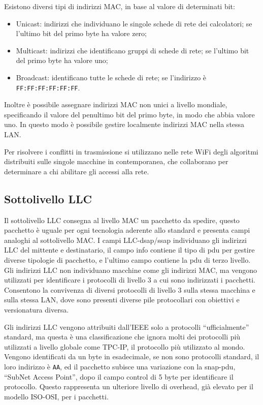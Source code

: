 \documentclass{article}
\numberwithin{equation}{subsection}
\begin{document}
Esistono diversi tipi di indirizzi MAC, in base al valore di determinati bit:
\begin{itemize}
  \item Unicast: indirizzi che individuano le singole schede di rete dei calcolatori; se l'ultimo bit del primo byte ha valore zero;
  \item Multicast: indirizzi che identificano gruppi di schede di rete; se l'ultimo bit del primo byte ha valore uno;
  \item Broadcast: identificano tutte le schede di rete; se l'indirizzo è \verb|FF:FF:FF:FF:FF:FF|.  
\end{itemize}

Inoltre è possibile assegnare indirizzi MAC non unici a livello mondiale, specificando il valore del penultimo bit del primo byte, in modo che abbia valore uno. In questo modo è possibile gestire localmente indirizzi 
MAC nella stessa LAN. 

Per risolvere i conflitti in trasmissione si utilizzano nelle rete WiFi degli algoritmi distribuiti sulle singole macchine in contemporanea, che collaborano per determinare a chi abilitare gli accessi alla rete. 

\subsection{Sottolivello LLC}

Il sottolivello LLC consegna al livello MAC un pacchetto da spedire, questo pacchetto è uguale per ogni tecnologia aderente allo standard e presenta campi analoghi al sottolivello MAC. I campi LLC-dsap/ssap individuano 
gli indirizzi LLC del mittente e destinatario, il campo info contiene il tipo di pdu per gestire diverse tipologie di pacchetto, e l'ultimo campo contiene la pdu di terzo livello. 
Gli indirizzi LLC non individuano macchine come gli indirizzi MAC, ma vengono utilizzati per identificare i protocolli di livello 3 a cui sono indirizzati i pacchetti. Consentono la convivenza di diversi protocolli 
di livello 3 sulla stessa macchina e sulla stessa LAN, dove sono presenti diverse pile protocollari con obiettivi e versionatura diversa. 

Gli indirizzi LLC vengono attribuiti dall'IEEE solo a protocolli ``ufficialmente'' standard, ma questa è una classificazione che ignora molti dei protocolli più utilizzati a livello globale come TPC-IP, il 
protocollo più utilizzato al mondo. Vengono identificati da un byte in esadecimale, se non sono protocolli standard, il loro indirizzo è \verb|AA|, ed il pacchetto subisce una variazione con la snap-pdu, 
``SubNet Access Point'', dopo il campo control di 5 byte per identificare il protocollo. Questo rappresenta un ulteriore livello di overhead, già elevato per il modello ISO-OSI, per i pacchetti. 
\end{document}
